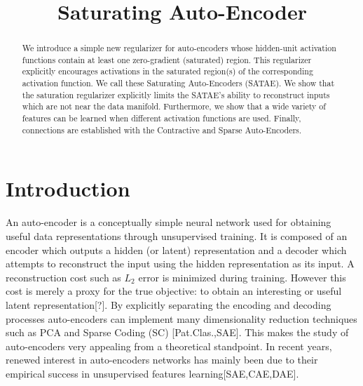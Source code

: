 \documentclass{article} %
\begin{document}
\title{Saturating Auto-Encoder} 
\date{} 
\maketitle


\begin{abstract} 
We introduce a simple new regularizer for auto-encoders whose hidden-unit activation functions contain at least one zero-gradient (saturated) region. This regularizer explicitly encourages activations in the saturated region(s) of the corresponding activation function. We call these Saturating Auto-Encoders (SATAE). We show that the saturation regularizer explicitly limits the SATAE's ability to reconstruct inputs which are not near the data manifold. Furthermore, we show that a wide variety of features can be learned when different activation functions are used. Finally, connections are established with the Contractive and Sparse Auto-Encoders.    

\end{abstract} 
\section{Introduction} 
An auto-encoder is a conceptually simple neural network used for obtaining useful data representations through unsupervised training. It is composed of an encoder which outputs a hidden (or latent) representation and a decoder which attempts to reconstruct the input using the hidden representation as its input. A reconstruction cost such as $L_2$ error is minimized during training. However this cost is merely a proxy for the true objective: to obtain an interesting or useful latent representation[?]. By explicitly separating the encoding and decoding processes auto-encoders can  implement many dimensionality reduction techniques such as PCA and Sparse Coding (SC) [Pat.Clas.,SAE]. This makes the study of auto-encoders very appealing from a theoretical standpoint. In recent years, renewed interest in auto-encoders networks has mainly been due to their empirical success in unsupervised features learning[SAE,CAE,DAE]. \\
\end{document}
